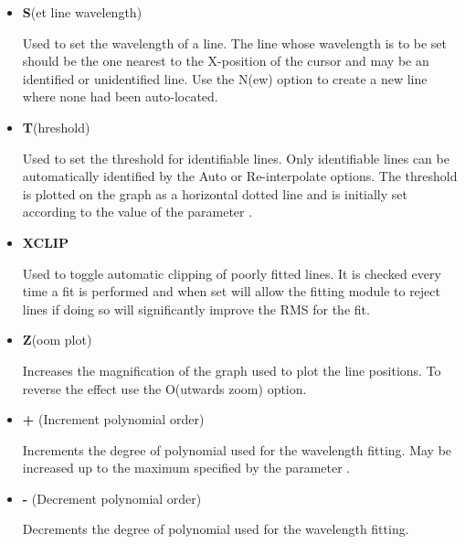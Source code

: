 \documentclass[twoside,11pt,nolof]{starlink}
\newcommand{\sunspec}[2]{#2}
\newcommand{\myindex}[1]{\index{#1}}
\begin{document}
\begin{itemize}
\begin{itemize}
      \item {\sunspec{\Large\tt}{\bf} S}(et line wavelength)
            \myindex{Arc fitting!set wavelength}

            Used to set the
            wavelength of a line. The line whose wavelength is to be set
            should be the one nearest to the X-position of the cursor and
            may be an identified or unidentified line. Use the N(ew) option
            to create a new line where none had been auto-located.

      \item {\sunspec{\Large\tt}{\bf} T}(hreshold)

            Used to set the threshold for
            identifiable lines. Only identifiable lines can be
            automatically identified by the Auto or Re-interpolate options.
            The threshold is plotted on the graph as a horizontal dotted
            line and is initially set according to the value of the
            parameter \@.

      \item {\sunspec{\Large\tt}{\bf} XCLIP}

            Used to toggle automatic clipping of
            poorly fitted lines.  It is checked every time a fit is
            performed and when set will allow the fitting module to reject
            lines if doing so will significantly improve the RMS for the
            fit.

      \item {\sunspec{\Large\tt}{\bf} Z}(oom plot)

            Increases the magnification of the
            graph used to plot the line positions. To reverse the effect
            use the O(utwards zoom) option.

      \item {\sunspec{\Large\tt}{\bf} +} (Increment polynomial order)

            Increments the degree
            of polynomial used for the wavelength fitting. May be increased
            up to the maximum specified by the parameter
            \@.

      \item {\sunspec{\Large\tt}{\bf} -} (Decrement polynomial order)

            Decrements the degree
            of polynomial used for the wavelength fitting.


\end{itemize}
\end{itemize}
\end{document}
